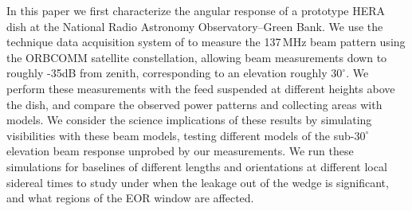 \documentclass{emulateapj}
\begin{document}

In this paper we first characterize the angular response of a prototype HERA dish at the National Radio 
Astronomy Observatory--Green Bank. We use the technique data acquisition system of \citet{neben15} to 
measure the 137\,MHz beam pattern using the ORBCOMM satellite constellation, allowing beam 
measurements down to roughly -35dB from zenith, corresponding to an elevation roughly $30^\circ$. We 
perform these measurements with the feed suspended at different heights above the dish, and compare the 
observed power patterns and collecting areas with models. We consider the science implications of these 
results by simulating visibilities with these beam models, testing different models of the sub-$30^\circ$ 
elevation beam response unprobed by our measurements. We run these simulations for baselines of different 
lengths and orientations at different local sidereal times to study under when the leakage out of the wedge is 
significant, and what regions of the EOR window are affected.
\end{document}
